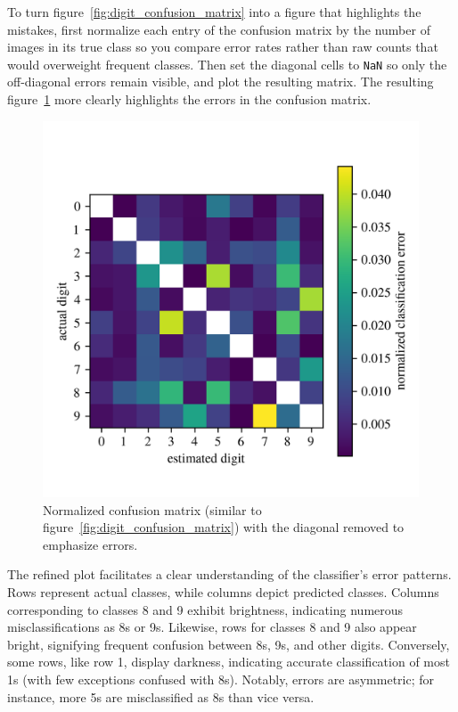 \documentclass[12pt,letter]{article}
\begin{document}
To turn figure~\ref{fig:digit_confusion_matrix} into a figure that highlights the mistakes, first normalize each entry of the confusion matrix by the number of images in its true class so you compare error rates rather than raw counts that would overweight frequent classes. Then set the diagonal cells to \texttt{NaN} so only the off-diagonal errors remain visible, and plot the resulting matrix. The resulting figure~\ref{fig:digit_confusion_matrix_2} more clearly highlights the errors in the confusion matrix.


\begin{figure}[H]
    \centering
    \includegraphics[width=4.4in]{../figures/digit_confusion_matrix_error.png}
	\vspace{-2ex}
    \caption{Normalized confusion matrix (similar to figure~\ref{fig:digit_confusion_matrix}) with the diagonal removed to emphasize errors.}
    \label{fig:digit_confusion_matrix_2}
\end{figure}

The refined plot facilitates a clear understanding of the classifier's error patterns. Rows represent actual classes, while columns depict predicted classes. Columns corresponding to classes 8 and 9 exhibit brightness, indicating numerous misclassifications as 8s or 9s. Likewise, rows for classes 8 and 9 also appear bright, signifying frequent confusion between 8s, 9s, and other digits. Conversely, some rows, like row 1, display darkness, indicating accurate classification of most 1s (with few exceptions confused with 8s). Notably, errors are asymmetric; for instance, more 5s are misclassified as 8s than vice versa.
\end{document}
